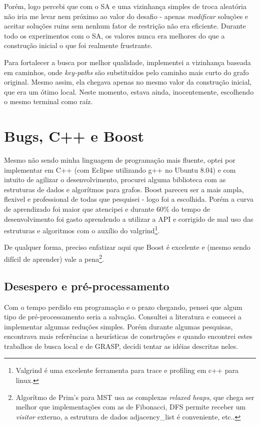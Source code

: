 \documentclass[a4paper,10pt,brazilian]{article}
\begin{document}
Porém, logo percebi que com o SA e uma vizinhança simples de troca aleatória não iria me levar nem próximo ao valor do desafio - apenas \textit{modificar} soluções e aceitar soluções ruins sem nenhum fator de restrição não era eficiente. Durante todo os experimentos com o SA, os valores nunca era melhores do que a construção inicial o que foi realmente frustrante.

Para fortalecer a busca por melhor qualidade, implementei a vizinhança baseada em caminhos, onde \textit{key-paths} são substituídos pelo caminho mais curto do grafo original. Mesmo assim, ela chegava apenas no mesmo valor da construção inicial, que era um ótimo local. Neste momento, estava ainda, inocentemente, escolhendo o mesmo terminal como raíz.

\section{Bugs, C++ e Boost}

Mesmo não sendo minha linguagem de programação mais fluente, optei por implementar em C++ (com Eclipse utilizando g++ no Ubuntu 8.04) e com intuito de agilizar o desenvolvimento, procurei alguma biblioteca com as estruturas de dados e algorítmos para grafos. Boost pareceu ser a mais ampla, flexivel e professional de todas que pesquisei - logo foi a escolhida. Porém a curva de aprendizado foi maior que atencipei e durante 60\% do tempo de desenvolvimento foi gasto aprendendo a utilizar a API e corrigido de mal uso das estruturas e algoritmos com o  auxílio do valgrind\footnote{Valgrind é uma excelente ferramenta para trace e profiling em c++ para linux.}. 

De qualquer forma, preciso enfatizar aqui que Boost é excelente e (mesmo sendo difícil de aprender) vale a pena\footnote{Algorítmo de Prim's para MST usa as complexas \textit{relaxed heaps}, que chega ser melhor que implementações com as de Fibonacci, DFS permite receber um \textit{visitor} externo, a estrutura de dados adjacency\_list é conveniente, etc..}. 

\subsection{Desespero e pré-processamento}

Com o tempo perdido em programação e o prazo chegando, pensei que algum tipo de pré-processamento seria a salvação. Consultei a literatura\cite{uchoa99preprocessing} e comecei a implementar algumas reduções simples. Porém durante algumas pesquisas, encontrava mais referências a heurísticas de construções e quando encontrei estes trabalhos de busca local\cite{Poggi_hybridlocal} e de GRASP, decidi tentar as idéias descritas neles.
\end{document}

